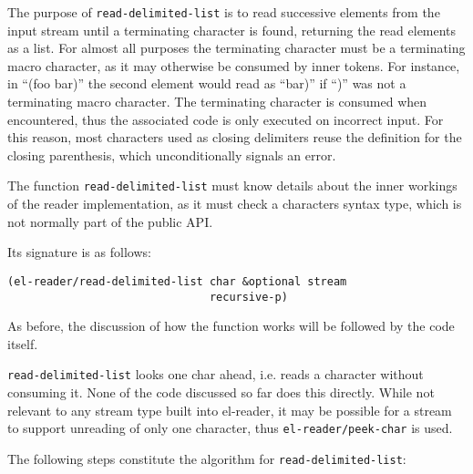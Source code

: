 \documentclass[a4paper,10pt,twoside]{report}
\newcommand{\elr}{el-reader}
\newcommand{\fun}[1]{\texttt{#1}}
\begin{document}
The purpose of \fun{read-delimited-list} is to read successive elements from the
input stream until a terminating character is found, returning the read elements
as a list.  For almost all purposes the terminating character must be a
terminating macro character, as it may otherwise be consumed by inner tokens.
For instance, in ``(foo bar)'' the second element would read as ``bar)'' if
``)'' was not a terminating macro character.  The terminating character is
consumed when encountered, thus the associated code is only executed on
incorrect input.  For this reason, most characters used as closing delimiters
reuse the definition for the closing parenthesis, which unconditionally signals
an error.

The function \fun{read-delimited-list} must know details about the inner
workings of the reader implementation, as it must check a characters syntax
type, which is not normally part of the public API.

Its signature is as follows:

\begin{lstlisting}[style=lispinline]
(el-reader/read-delimited-list char &optional stream
                               recursive-p)
\end{lstlisting}

As before, the discussion of how the function works will be followed by the code
itself.

\fun{read-delimited-list} looks one char ahead, i.e. reads a character without
consuming it.  None of the code discussed so far does this directly.  While not
relevant to any stream type built into \elr{}, it may be possible for a stream
to support unreading of only one character, thus \fun{el-reader/peek-char} is
used.

The following steps constitute the algorithm for \fun{read-delimited-list}:
\end{document}
